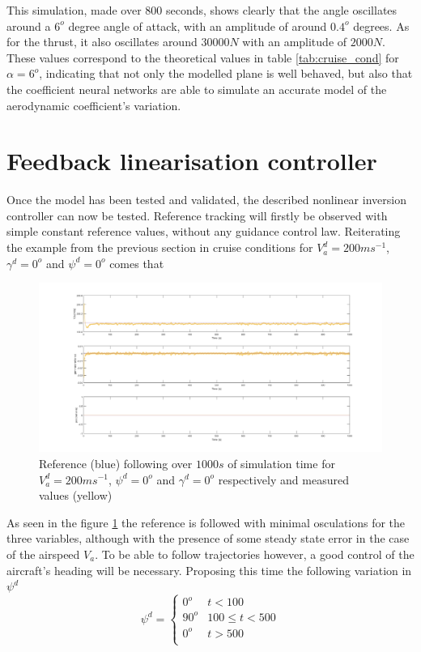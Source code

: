 This simulation, made over 800 seconds, shows clearly that the angle oscillates around a $6^o$ degree angle of attack, with an amplitude of around $0.4^o$ degrees. As for the thrust, it also oscillates around $30000N$ with an amplitude of $2000N$. These values correspond to the theoretical values in table \ref{tab:cruise_cond} for $\alpha=6^o$, indicating that not only the modelled plane is well behaved, but also that the coefficient neural networks are able to simulate an accurate model of the aerodynamic coefficient's variation.


\section{Feedback linearisation controller}
\label{section:results/fl_contro}

Once the model has been tested and validated, the described nonlinear inversion controller can now be tested. Reference tracking will firstly be observed with simple constant reference values, without any guidance control law. Reiterating the example from the previous section in cruise conditions for $V_a^d=200 ms^{-1}$, $\gamma^d = 0^o$ and $\psi^d = 0^o$ comes that
\begin{figure}[h]
\centering
\includegraphics[width=\textwidth]{Figures/Results/nli_test_const.png}
\caption[Constant reference following of feedback linearisation controller]{Reference (blue) following over $1000s$ of simulation time for $V_a^d=200 ms^{-1}$, $\psi^d = 0^o$ and $\gamma^d = 0^o$ respectively and measured values (yellow)}
\label{fig:const_ref}
\end{figure}

As seen in the figure \ref{fig:const_ref} the reference is followed with minimal osculations for the three variables, although with the presence of some steady state error in the case of the airspeed $V_a$. To be able to follow trajectories however, a good control of the aircraft's heading will be necessary. Proposing this time the following variation in $\psi^d$
\begin{equation}
\psi^d = \begin{cases}
0^o & t < 100\\
90^o & 100 \leq t < 500\\
0^o & t > 500 \\
\end{cases}
\end{equation}


